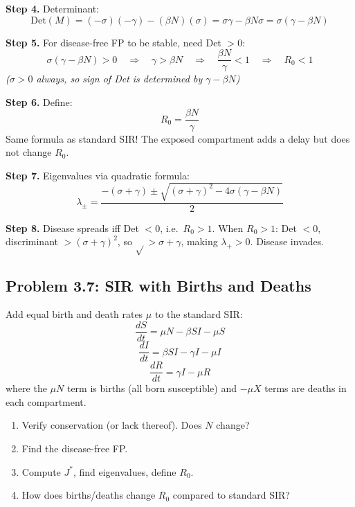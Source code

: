 \documentclass[10pt]{article}
\newcommand{\thus}{\quad\Longrightarrow\quad}
\newcommand{\stepwhy}[1]{\textcolor{blue!60!black}{\small\textit{(#1)}}}
\begin{document}
\begin{solution}
\textbf{Step 4.} Determinant:
\[
\text{Det}(M) = (-\sigma)(-\gamma) - (\beta N)(\sigma) = \sigma\gamma - \beta N\sigma = \sigma(\gamma - \beta N)
\]

\textbf{Step 5.} For disease-free FP to be stable, need Det $> 0$:
\[
\sigma(\gamma - \beta N) > 0 \thus \gamma > \beta N \thus \frac{\beta N}{\gamma} < 1 \thus R_0 < 1
\]
\stepwhy{$\sigma > 0$ always, so sign of Det is determined by $\gamma - \beta N$}

\textbf{Step 6.} Define:
\[
\boxed{R_0 = \frac{\beta N}{\gamma}}
\]
Same formula as standard SIR! The exposed compartment adds a delay but does not change $R_0$.

\textbf{Step 7.} Eigenvalues via quadratic formula:
\[
\lambda_\pm = \frac{-(\sigma+\gamma) \pm \sqrt{(\sigma+\gamma)^2 - 4\sigma(\gamma - \beta N)}}{2}
\]

\textbf{Step 8.} Disease spreads iff Det $< 0$, i.e.\ $R_0 > 1$. When $R_0 > 1$: Det $< 0$, discriminant $> (\sigma+\gamma)^2$, so $\sqrt{} > \sigma+\gamma$, making $\lambda_+ > 0$. Disease invades.
\end{solution}

\subsection{Problem 3.7: SIR with Births and Deaths}

\begin{problem}
Add equal birth and death rates $\mu$ to the standard SIR:
\[
\frac{dS}{dt} = \mu N - \beta SI - \mu S
\]
\[
\frac{dI}{dt} = \beta SI - \gamma I - \mu I
\]
\[
\frac{dR}{dt} = \gamma I - \mu R
\]
where the $\mu N$ term is births (all born susceptible) and $-\mu X$ terms are deaths in each compartment.

\begin{enumerate}[label=(\alph*)]
\item Verify conservation (or lack thereof). Does $N$ change?
\item Find the disease-free FP.
\item Compute $J^*$, find eigenvalues, define $R_0$.
\item How does births/deaths change $R_0$ compared to standard SIR?
\end{enumerate}
\end{problem}
\end{document}

